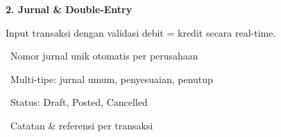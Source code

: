 \documentclass[a4paper]{article}
\begin{document}
\begin{minipage}[t]{0.485\textwidth}
    \colorbox{BluePrimary}{%
        \begin{minipage}{\dimexpr\textwidth-2\fboxsep\relax}
            {\fontsize{10}{13}\selectfont\bfseries\color{White} 2. Jurnal \& Double-Entry}
        \end{minipage}}\par
    \vspace{4pt}
    {\fontsize{9}{12}\selectfont\color{TextDark}%
    Input transaksi dengan validasi debit = kredit secara real-time.\par\vspace{3pt}
    \textbullet\ Nomor jurnal unik otomatis per perusahaan\par\vspace{2pt}%
    \textbullet\ Multi-tipe: jurnal umum, penyesuaian, penutup\par\vspace{2pt}%
    \textbullet\ Status: Draft, Posted, Cancelled\par\vspace{2pt}%
    \textbullet\ Catatan \& referensi per transaksi}%
\end{minipage}

\vspace{8pt}
\end{document}
